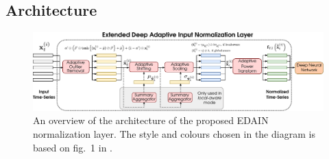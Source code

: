 \documentclass{statsmsc}
\begin{document}
{\subsection{Architecture}%
\label{sub:edain_arch}

\begin{figure}
\begin{center}
    \includegraphics[width=\textwidth]{diagrams/edain-diagram.pdf}
\end{center}
\caption{An overview of the architecture of the proposed \ac{EDAIN} normalization layer. The
style and colours chosen in the diagram is based on fig.\ 1 in \cite{dain}.}
\label{fig:edain-arch}
\end{figure}

}
\end{document}
